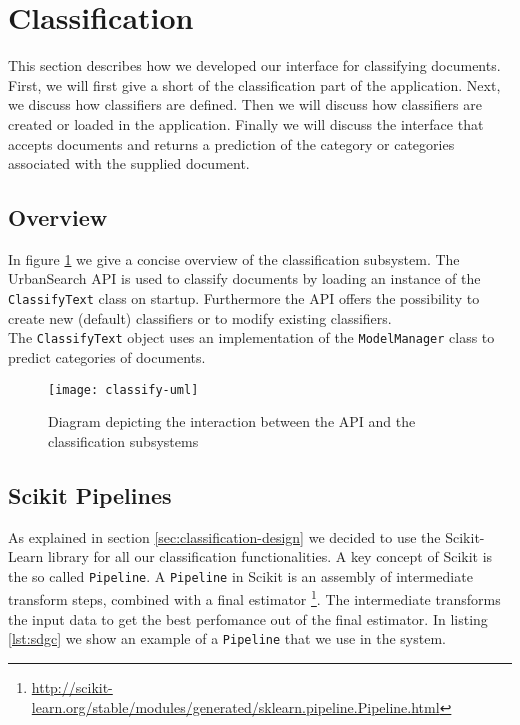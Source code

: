 \section{Classification}\label{5-classification}
This section describes how we developed our interface for classifying documents. First, we will first give a short of the classification part of the application. Next, we discuss how classifiers are defined. Then we will discuss how classifiers are created or loaded in the application. Finally we will discuss the interface that accepts documents and returns a prediction of the category or categories associated with the supplied document.

\subsection{Overview}
In figure \ref{fig:classify-uml} we give a concise overview of the classification subsystem. The UrbanSearch API is used to classify documents by loading an instance of the \texttt{ClassifyText} class on startup. Furthermore the API offers the possibility to create new (default) classifiers or to modify existing classifiers.\\
The \texttt{ClassifyText} object uses an implementation of the \texttt{ModelManager} class to predict categories of documents.
\begin{figure}[H]
\centering
\texttt{[image: classify-uml]}
\caption{Diagram depicting the interaction between the API and the classification subsystems}
\label{fig:classify-uml}
\end{figure}


\subsection{Scikit Pipelines}
As explained in section \ref{sec:classification-design} we decided to use the Scikit-Learn library for all our classification functionalities. A key concept of Scikit is the so called \texttt{Pipeline}. A \texttt{Pipeline} in Scikit is an assembly of intermediate transform steps, combined with a final estimator \footnote{\url{http://scikit-learn.org/stable/modules/generated/sklearn.pipeline.Pipeline.html}}. The intermediate transforms the input data to get the best perfomance out of the final estimator. In listing \ref{lst:sdgc} we show an example of a \texttt{Pipeline} that we use in the system.\\

